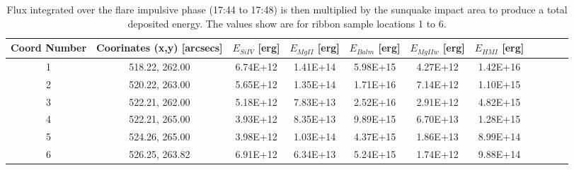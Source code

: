 \begin{table}
\tiny
\centering
\begin{tabular}{|c|c|c|c|c|c|c|c|c|c|c|}
Coord Number & Coorinates (x,y) [arcsecs] & $E_{Si IV}$ [erg] & $E_{Mg II}$ [erg] & $E_{Balm}$ [erg] & $E_{Mg II w}$ [erg] & $E_{HMI}$ [erg]\\
\hline
1 & 518.22, 262.00 & 6.74E+12 & 1.41E+14 & 5.98E+15 & 4.27E+12 & 1.42E+16\\
2 & 520.22, 263.00 & 5.65E+12 & 1.35E+14 & 1.71E+16 & 7.14E+12 & 1.10E+15\\
3 & 522.21, 262.00 & 5.18E+12 & 7.83E+13 & 2.52E+16 & 2.91E+12 & 4.82E+15\\
4 & 522.21, 265.00 & 3.93E+12 & 8.35E+13 & 9.89E+15 & 6.70E+13 & 1.28E+15\\
5 & 524.26, 265.00 & 3.98E+12 & 1.03E+14 & 4.37E+15 & 1.86E+13 & 8.99E+14\\
6 & 526.25, 263.82 & 6.91E+12 & 6.34E+13 & 5.24E+15 & 1.74E+12 & 9.88E+14\\
\end{tabular}
\caption{Flux integrated over the flare impulsive phase (17:44 to 17:48) is then multiplied by the sunquake impact area to produce a total deposited energy. The values show are for ribbon sample locations 1 to 6.}\label{eimp}
\end{table}



